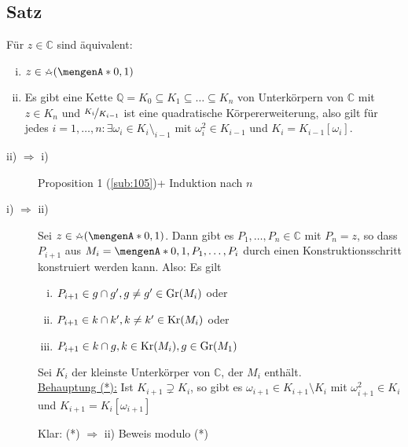 \subsection[Satz: Äquivalenz zu $z \in \mathds{C}$ ist konstruierbar aus $\{0,1\}$]{Satz} %
\label{sub:1011}
Für $z \in \mathds{C}$ sind äquivalent: 
\begin{enumerate}[i)]
	\item $z \in \zirkel (\set{0,1})$
	\item Es gibt eine Kette $\mathds{Q} = K_0 \subseteq K_1 \subseteq \ldots \subseteq K_n$ von Unterkörpern von $\mathds{C}$ mit $z \in K_n$ und $\nicefrac{K_i}{K_{i-1}}$
	ist eine quadratische Körpererweiterung, also gilt für jedes $i=1,\ldots ,n : \exists \omega_i \in K_i \setminus_{i-1}$ mit $\omega_i^2 \in K_{i-1}$ und 
	$K_i = K_{i-1}[\omega_i]$.
\end{enumerate}
\begin{description}
	\item[ii) $\Rightarrow $ i)] Proposition 1 (\ref{sub:105})+ Induktion nach $n$
	\item[i) $\Rightarrow $ ii)] Sei $z \in \zirkel(\set{0,1})$. Dann gibt es $P_1, \ldots , P_n \in \mathds{C}$ mit $P_n = z$, so dass $P_{i+1}$ aus 
	$M_i = \set{0,1, P_1, \ldots , P_{i}} $ durch einen Konstruktionsschritt konstruiert werden kann. Also: Es gilt 
	\begin{enumerate}[(i)]
		\item $P_{i+1} \in g \cap g', g \not= g' \in \operatorname{Gr}(M_i)$ oder 
		\item $P_{i+1} \in k \cap k', k \not= k' \in \operatorname{Kr}(M_i)$ oder 
		\item $P_{i+1} \in k \cap g, k \in \operatorname{Kr}(M_i), g \in \operatorname{Gr}(M_1)$
	\end{enumerate}
	Sei $K_i$ der kleinste Unterkörper von $\mathds{C}$, der $M_i$ enthält. \\
	\uline{Behauptung (*):} Ist $K_{i+1} \supsetneq K_i$, so gibt es $\omega_{i+1} \in K_{i+1} \setminus K_i$ mit $\omega_{i+1}^2 \in K_i$ und $K_{i+1} = K_i[\omega_{i+1}]$
	
	Klar: (*) $\Rightarrow $ ii) Beweis modulo (*) \bewende
\end{description}


